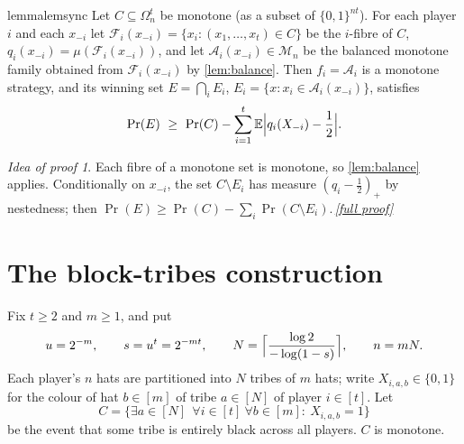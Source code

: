 \documentclass[11pt,a4paper]{article}
\theoremstyle{plain}
\theoremstyle{definition}
\theoremstyle{remark}
\newtheorem*{proofidea}{Idea of proof}
\newcommand{\fullproofref}[1]{\,\hyperref[#1]{\textit{[full proof]}}}
\newcommand{\E}{\mathbb E}
\newcommand{\Prob}{\Pr}
\newcommand{\cA}{\mathcal A}
\newcommand{\cF}{\mathcal F}
\newcommand{\cM}{\mathcal M}
\newcommand{\Om}{\Omega}
\begin{document}
\begin{restatable}[Synchronisation]{lemma}{lemsync}\label{lem:sync}
Let $C\subseteq\Om_n^t$ be monotone (as a subset of $\{0,1\}^{nt}$). For each player $i$ and each $x_{-i}$ let $\cF_i(x_{-i})=\{x_i:(x_1,\dots,x_t)\in C\}$ be the $i$-fibre of $C$, $q_i(x_{-i})=\mu(\cF_i(x_{-i}))$, and let $\cA_i(x_{-i})\in\cM_n$ be the balanced monotone family obtained from $\cF_i(x_{-i})$ by \cref{lem:balance}. Then $f_i=\cA_i$ is a monotone strategy, and its winning set $E=\bigcap_iE_i$, $E_i=\{x:x_i\in\cA_i(x_{-i})\}$, satisfies
\begin{equation}\label{eq:sync}
 \Prob(E)\ \ge\ \Prob(C)-\sum_{i=1}^t\E\Bigl|q_i(X_{-i})-\frac12\Bigr| .
\end{equation}
\end{restatable}
\begin{proofidea}
Each fibre of a monotone set is monotone, so \cref{lem:balance} applies. Conditionally on $x_{-i}$, the set $C\setminus E_i$ has measure $(q_i-\frac12)_+$ by nestedness; then $\Prob(E)\ge\Prob(C)-\sum_i\Prob(C\setminus E_i)$.\fullproofref{pf:sync}
\end{proofidea}

\section{The block-tribes construction}\label{sec:tribes}

Fix $t\ge2$ and $m\ge1$, and put
\begin{equation}\label{eq:params}
 u=2^{-m},\qquad s=u^t=2^{-mt},\qquad N=\Bigl\lceil\frac{\log2}{-\log(1-s)}\Bigr\rceil,\qquad n=mN .
\end{equation}
Each player's $n$ hats are partitioned into $N$ tribes of $m$ hats; write $X_{i,a,b}\in\{0,1\}$ for the colour of hat $b\in[m]$ of tribe $a\in[N]$ of player $i\in[t]$. Let
\[
 C=\bigl\{\exists a\in[N]\ \ \forall i\in[t]\ \forall b\in[m]:\ X_{i,a,b}=1\bigr\}
\]
be the event that some tribe is entirely black across all players. $C$ is monotone.
\end{document}
